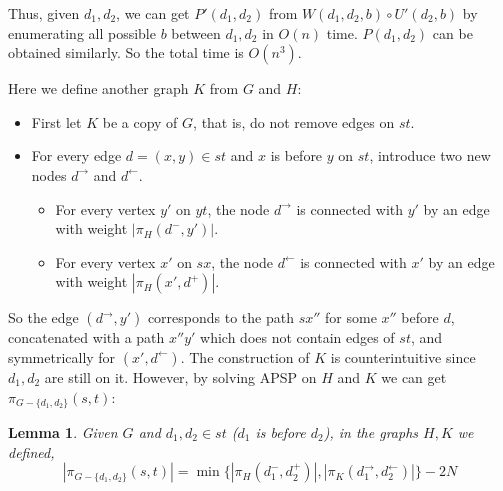 \documentclass[11pt]{article}
\theoremstyle{plain}
\newtheorem{lemma}[theorem]{Lemma}
\theoremstyle{definition}
\newcommand{\set}[1]{\{ #1 \}}
\newcommand{\og}[3]{\pi_{G-#3}\left(#1,#2\right)}
\begin{document}
Thus, given $d_1,d_2$, we can get $P'(d_1,d_2)$ from $W(d_1,d_2,b)\circ U'(d_2,b)$ by enumerating all possible $b$ between $d_1,d_2$ in $O(n)$ time. $P(d_1,d_2)$ can be obtained similarly. So the total time is $O(n^3)$.

\iffalse
Here we define another graph $K$ from $G$ and $H$:
\begin{itemize}
    \item First let $K$ be a copy of $G$, that is, do not remove edges on $st$.
    \item For every edge $d=(x,y)\in st$ and $x$ is before $y$ on $st$, introduce two new nodes $d^\rightarrow$ and $d^\leftarrow$. 
    \begin{itemize}
        \item For every vertex $y'$ on $yt$, the node $d^\rightarrow$ is connected with $y'$ by an edge with weight $|\pi_H(d^-,y')|$.
        \item For every vertex $x'$ on $sx$, the node $d^\leftarrow$ is connected with $x'$ by an edge with weight $|\pi_H(x',d^+)|$.
    \end{itemize}
\end{itemize}

So the edge $(d^\rightarrow,y')$ corresponds to the path $sx''$ for some $x''$ before $d$, concatenated with a path $x''y'$ which does not contain edges of $st$, and symmetrically for $(x',d^\leftarrow)$. The construction of $K$ is counterintuitive since $d_1,d_2$ are still on it. However, by solving APSP on $H$ and $K$ we can get $\og{s}{t}{\set{d_1, d_2}}$:

\begin{lemma} \label{lemma:2-2}
    Given $G$ and $d_1,d_2\in st$ ($d_1$ is before $d_2$), in the graphs $H,K$ we defined,
    $$|\og{s}{t}{\set{d_1, d_2}}|=\min\{|\pi_H(d_1^-,d_2^+)|, |\pi_K(d_1^\rightarrow, d_2^\leftarrow)|\}-2N$$
\end{lemma}
\end{document}
